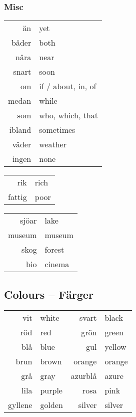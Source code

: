 \documentclass[14pt]{refcard} %
\begin{document}
\vspace{-1em}
\subsubsection{Misc}
\vspace{-1ex}
\begin{tabular}{rl}
än    & yet  \\
båder & both \\
nära  & near \\
snart & soon \\
om    & if / about, in, of \\
medan & while \\
som   & who, which, that \\
ibland & sometimes \\
väder & weather \\
ingen & none \\
\end{tabular}

\begin{tabular}{rl}
rik & rich \\
fattig & poor \\
\end{tabular}

\begin{tabular}{rl}
sjöar & lake \\
museum & museum \\
skog & forest \\
bio & cinema \\
\end{tabular}


\subsection{Colours -- Färger}

\begin{tabular}{rl rl}
vit     & white  & svart   & black  \\
röd     & red    & grön    & green  \\
blå     & blue   & gul     & yellow \\
brun    & brown  & orange  & orange \\
grå     & gray   & azurblå & azure  \\
lila    & purple & rosa    & pink   \\
gyllene & golden & silver  & silver \\
\end{tabular}
\end{document}
